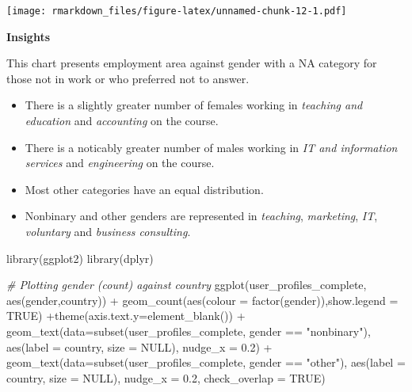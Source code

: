 \documentclass[
]{article}
\newenvironment{Shaded}{\begin{snugshade}}{\end{snugshade}}
\newcommand{\AttributeTok}[1]{\textcolor[rgb]{0.77,0.63,0.00}{#1}}
\newcommand{\CommentTok}[1]{\textcolor[rgb]{0.56,0.35,0.01}{\textit{#1}}}
\newcommand{\ConstantTok}[1]{\textcolor[rgb]{0.00,0.00,0.00}{#1}}
\newcommand{\FloatTok}[1]{\textcolor[rgb]{0.00,0.00,0.81}{#1}}
\newcommand{\FunctionTok}[1]{\textcolor[rgb]{0.00,0.00,0.00}{#1}}
\newcommand{\NormalTok}[1]{#1}
\newcommand{\SpecialCharTok}[1]{\textcolor[rgb]{0.00,0.00,0.00}{#1}}
\newcommand{\StringTok}[1]{\textcolor[rgb]{0.31,0.60,0.02}{#1}}
\begin{document}
\texttt{[image: rmarkdown\_files/figure-latex/unnamed-chunk-12-1.pdf]}

\textbf{Insights}

This chart presents employment area against gender with a NA category
for those not in work or who preferred not to answer.

\begin{itemize}
\item
  There is a slightly greater number of females working in
  \emph{teaching and education} and \emph{accounting} on the course.
\item
  There is a noticably greater number of males working in \emph{IT and
  information services} and \emph{engineering} on the course.
\item
  Most other categories have an equal distribution.
\item
  Nonbinary and other genders are represented in \emph{teaching},
  \emph{marketing}, \emph{IT}, \emph{voluntary} and \emph{business
  consulting}.
\end{itemize}

\begin{Shaded}
\begin{Highlighting}[]
\FunctionTok{library}\NormalTok{(ggplot2)}
\FunctionTok{library}\NormalTok{(dplyr)}

\CommentTok{\# Plotting gender (count) against country}
\FunctionTok{ggplot}\NormalTok{(user\_profiles\_complete, }\FunctionTok{aes}\NormalTok{(gender,country)) }\SpecialCharTok{+} \FunctionTok{geom\_count}\NormalTok{(}\FunctionTok{aes}\NormalTok{(}\AttributeTok{colour =} \FunctionTok{factor}\NormalTok{(gender)),}\AttributeTok{show.legend =} \ConstantTok{TRUE}\NormalTok{) }\SpecialCharTok{+}\FunctionTok{theme}\NormalTok{(}\AttributeTok{axis.text.y=}\FunctionTok{element\_blank}\NormalTok{()) }\SpecialCharTok{+} \FunctionTok{geom\_text}\NormalTok{(}\AttributeTok{data=}\FunctionTok{subset}\NormalTok{(user\_profiles\_complete, gender }\SpecialCharTok{==} \StringTok{"nonbinary"}\NormalTok{), }\FunctionTok{aes}\NormalTok{(}\AttributeTok{label =}\NormalTok{ country, }\AttributeTok{size =} \ConstantTok{NULL}\NormalTok{), }\AttributeTok{nudge\_x =} \FloatTok{0.2}\NormalTok{) }\SpecialCharTok{+} \FunctionTok{geom\_text}\NormalTok{(}\AttributeTok{data=}\FunctionTok{subset}\NormalTok{(user\_profiles\_complete, gender }\SpecialCharTok{==} \StringTok{"other"}\NormalTok{), }\FunctionTok{aes}\NormalTok{(}\AttributeTok{label =}\NormalTok{ country, }\AttributeTok{size =} \ConstantTok{NULL}\NormalTok{), }\AttributeTok{nudge\_x =} \FloatTok{0.2}\NormalTok{, }\AttributeTok{check\_overlap =} \ConstantTok{TRUE}\NormalTok{)}
\end{Highlighting}
\end{Shaded}
\end{document}
